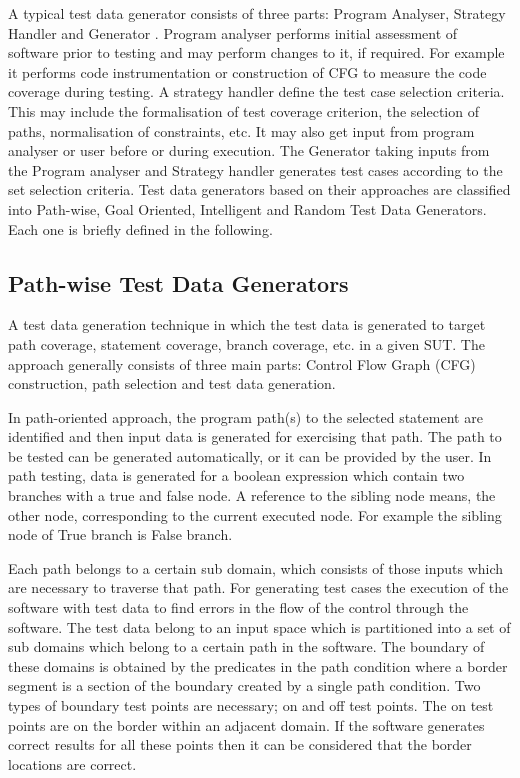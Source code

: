 A typical test data generator consists of three parts: Program Analyser, Strategy Handler and Generator \cite{edvardsson1999survey}. Program analyser performs initial assessment of software prior to testing and may perform changes to it, if required. For example it performs code instrumentation or construction of CFG to measure the code coverage during testing. A strategy handler define the test case selection criteria. This may include the formalisation of test coverage criterion, the selection of paths, normalisation of constraints, etc. It may also get input from   program analyser or user before or during execution. The Generator taking inputs from the Program analyser and Strategy handler generates test cases according to the set selection criteria.  Test data generators based on their approaches are classified into Path-wise, Goal Oriented, Intelligent and Random Test Data Generators. Each one is briefly defined in the following.

\subsection{Path-wise Test Data Generators}
A test data generation technique in which the test data is generated to target path coverage, statement coverage, branch coverage, etc. in a given SUT. The approach generally consists of three main parts: Control Flow Graph (CFG) construction, path selection and test data generation. 

In path-oriented approach, the program path(s) to the selected statement are identified and then input data is generated for exercising that path. The path to be tested can be generated automatically, or it can be provided by the user. In path testing, data is generated for a boolean expression which contain two branches with a true and false node. A reference to the sibling node means, the other node, corresponding to the current executed node. For example the sibling node of True branch is False branch.

Each path belongs to a certain sub domain, which consists of those inputs which are necessary to traverse that path. For generating test cases the execution of the software with test data to find errors in the flow of the control through the software. The test data belong to an input space which is partitioned into a set of sub domains which belong to a certain path in the software. The boundary of these domains is obtained by the predicates in the path condition where a border segment is a section of the boundary created by a single path condition. Two types of boundary test points are necessary; on and off test points. The on test points are on the border within an adjacent domain. If the software generates correct results for all these points then it can be considered that the border locations are correct.

